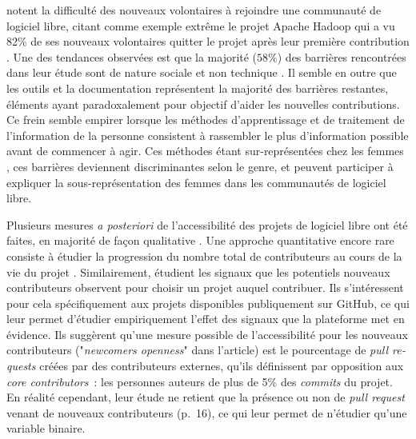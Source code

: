 \documentclass[dvipsnames,runningheads]{llncs}
\newcommand{\en}[1]{\foreignlanguage{english}{\emph{#1}}}
\begin{document}
    \textcite{barriers-2018} notent la difficulté des nouveaux volontaires à rejoindre une communauté de
    logiciel libre, citant comme exemple extrême le projet Apache Hadoop qui a vu 82\% de ses nouveaux
    volontaires quitter le projet après leur première contribution \parencite{hadoop-dropout-2013}. Une des
    tendances observées est que la majorité ($58\%$) des barrières rencontrées dans leur étude sont de nature
    sociale et non technique \parencite[p.~1008]{barriers-2018}. Il semble en outre que les outils et la
    documentation représentent la majorité des barrières restantes, éléments ayant paradoxalement
    pour objectif d'aider les nouvelles contributions. Ce frein semble empirer lorsque les méthodes
    d'apprentissage et de traitement de l'information de la personne consistent à rassembler le plus
    d'information possible avant de commencer à agir. Ces méthodes étant sur-représentées chez les femmes
    \parencite{gender-information-processing-1995,gender-information-processing-2015}, ces barrières
    deviennent discriminantes selon le genre, et peuvent participer à expliquer la sous-représentation des
    femmes dans les communautés de logiciel libre.

    \label{sec:accessibility-measure}
    Plusieurs mesures \emph{a posteriori} de l'accessibilité des projets de logiciel libre ont été faites, en
    majorité de façon qualitative
    \parencites{newcomers-accessibility-2016}{newcomers-onboarding-2018}{newcomers-adaptation-2005}. Une
    approche quantitative encore rare consiste à étudier la progression du nombre total de contributeurs au
    cours de la vie du projet \cite{contributor-count-2006}. Similairement, \textcite{signals-2019} étudient
    les signaux que les potentiels nouveaux contributeurs observent pour choisir un projet auquel contribuer.
    Ils s'intéressent pour cela spécifiquement aux projets disponibles publiquement sur GitHub, ce qui leur
    permet d'étudier empiriquement l'effet des signaux que la plateforme met en évidence. Ils suggèrent qu'une
    mesure possible de l'accessibilité pour les nouveaux contributeurs ("\en{newcomers openness}" dans
    l'article) est le pourcentage de \en{pull requests} créées par des contributeurs externes, qu'ils
    définissent par opposition aux \en{core contributors} : les personnes auteurs de plus de 5\% des
    \en{commits} du projet. En réalité cependant, leur étude ne retient que la présence ou non de \en{pull
    request} venant de nouveaux contributeurs (p.~16), ce qui leur permet de n'étudier qu'une variable
    binaire.
\end{document}
